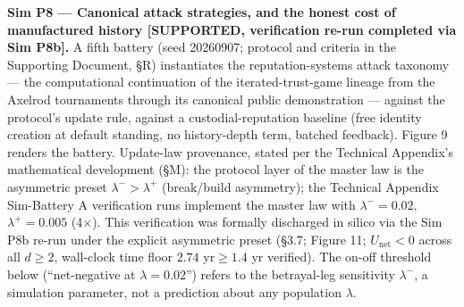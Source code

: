 \documentclass[
]{article}
\begin{document}
\begin{itemize}
  \textbf{Sim P8 --- Canonical attack strategies, and the honest cost of
  manufactured history {[}SUPPORTED, verification re-run completed via
  Sim P8b{]}.} A fifth battery (seed 20260907; protocol and criteria in
  the Supporting Document, §R) instantiates the reputation-systems
  attack taxonomy --- the computational continuation of the
  iterated-trust-game lineage from the Axelrod tournaments through its
  canonical public demonstration --- against the protocol's update rule,
  against a custodial-reputation baseline (free identity creation at
  default standing, no history-depth term, batched feedback). Figure 9
  renders the battery. Update-law provenance, stated per the Technical
  Appendix's mathematical development (§M): the protocol layer of the
  master law is the asymmetric preset \(\lambda^{-} > \lambda^{+}\)
  (break/build asymmetry); the Technical Appendix Sim-Battery A
  verification runs implement the master law with
  \(\lambda^{-} = 0.02,\) \(\lambda^{+} = 0.005\) (4\(\times\)). This
  verification was formally discharged in silico via the Sim P8b re-run
  under the explicit asymmetric preset (§3.7; Figure 11;
  \(U_{\text{net}} < 0\) across all \(d \ge 2\), wall-clock time floor
  \(2.74\text{ yr} \ge 1.4\text{ yr}\) verified). The on-off threshold
  below (``net-negative at \(\lambda = 0.02\)'') refers to the
  betrayal-leg sensitivity \(\lambda^{-}\), a simulation parameter, not
  a prediction about any population \(\lambda\).


\end{itemize}
\end{document}
